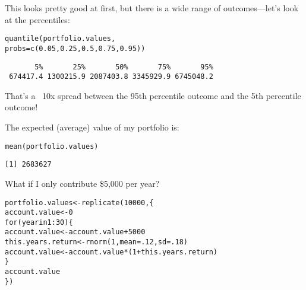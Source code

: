 \documentclass{beamer}\usepackage[]{graphicx}\usepackage[]{color}
\makeatletter
\newcommand{\hlnum}[1]{\textcolor[rgb]{0.824,0.412,0.118}{#1}}%
\newcommand{\hlopt}[1]{\textcolor[rgb]{1,0.894,0.769}{#1}}%
\newcommand{\hlstd}[1]{\textcolor[rgb]{1,0.894,0.769}{#1}}%
\newcommand{\hlkwa}[1]{\textcolor[rgb]{0.941,0.902,0.549}{#1}}%
\newcommand{\hlkwb}[1]{\textcolor[rgb]{0.804,0.776,0.451}{#1}}%
\newcommand{\hlkwc}[1]{\textcolor[rgb]{0.78,0.941,0.545}{#1}}%
\newcommand{\hlkwd}[1]{\textcolor[rgb]{1,0.78,0.769}{#1}}%
\newenvironment{kframe}{%
 \def\at@end@of@kframe{}%
 \ifinner\ifhmode%
  \def\at@end@of@kframe{\end{minipage}}%
  \begin{minipage}{\columnwidth}%
 \fi\fi%
 \def\FrameCommand##1{\hskip\@totalleftmargin \hskip-\fboxsep
 \colorbox{shadecolor}{##1}\hskip-\fboxsep
     \hskip-\linewidth \hskip-\@totalleftmargin \hskip\columnwidth}%
 \MakeFramed {\advance\hsize-\width
   \@totalleftmargin\z@ \linewidth\hsize
   \@setminipage}}%
 {\par\unskip\endMakeFramed%
 \at@end@of@kframe}
\newenvironment{knitrout}{}{} %
\makeatother
\begin{document}
\begin{darkframes}
    \begin{frame}[fragile]
      This looks pretty good at first, but there is a wide range of outcomes---let's look at the percentiles:
\begin{knitrout}
\begin{kframe}
\begin{alltt}
\hlkwd{quantile}\hlstd{(portfolio.values,}
  \hlkwc{probs}\hlstd{=}\hlkwd{c}\hlstd{(}\hlnum{0.05}\hlstd{,} \hlnum{0.25}\hlstd{,} \hlnum{0.5}\hlstd{,} \hlnum{0.75}\hlstd{,} \hlnum{0.95}\hlstd{))}
\end{alltt}
\begin{verbatim}
       5%       25%       50%       75%       95% 
 674417.4 1300215.9 2087403.8 3345929.9 6745048.2 
\end{verbatim}
\end{kframe}
\end{knitrout}
      That's a ~10x spread between the 95th percentile outcome and the 5th percentile outcome!

      \pause
      \bigskip
      The expected (average) value of my portfolio is:
\begin{knitrout}
\begin{kframe}
\begin{alltt}
\hlkwd{mean}\hlstd{(portfolio.values)}
\end{alltt}
\begin{verbatim}
[1] 2683627
\end{verbatim}
\end{kframe}
\end{knitrout}
    \end{frame}

    \begin{frame}[fragile]{What if I only contribute \$5,000 per year?}
      \fontsize{9}{9}\selectfont
\begin{knitrout}
\begin{kframe}
\begin{alltt}
\hlstd{portfolio.values} \hlkwb{<-} \hlkwd{replicate}\hlstd{(}\hlnum{10000}\hlstd{, \{}
  \hlstd{account.value} \hlkwb{<-} \hlnum{0}
  \hlkwa{for} \hlstd{(year} \hlkwa{in} \hlnum{1}\hlopt{:}\hlnum{30}\hlstd{) \{}
    \hlstd{account.value} \hlkwb{<-} \hlstd{account.value} \hlopt{+} \hlnum{5000}
    \hlstd{this.years.return} \hlkwb{<-} \hlkwd{rnorm}\hlstd{(}\hlnum{1}\hlstd{,} \hlkwc{mean}\hlstd{=}\hlnum{.12}\hlstd{,} \hlkwc{sd}\hlstd{=}\hlnum{.18}\hlstd{)}
    \hlstd{account.value} \hlkwb{<-} \hlstd{account.value} \hlopt{*} \hlstd{(}\hlnum{1} \hlopt{+} \hlstd{this.years.return)}
  \hlstd{\}}
  \hlstd{account.value}
\hlstd{\})}
\end{alltt}
\end{kframe}
\end{knitrout}
    \end{frame}


\end{darkframes}
\end{document}
